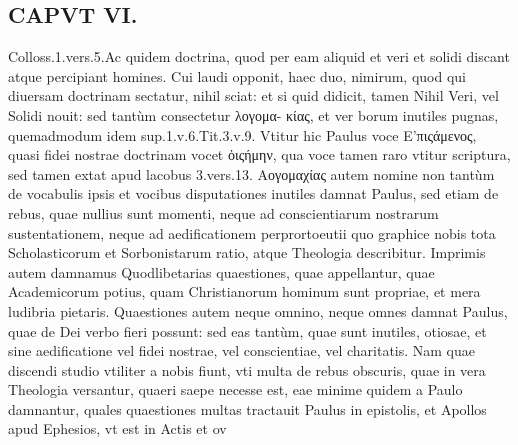 \documentclass{article}
\begin{document}
\begin{pages}
\section*{CAPVT  VI. }
\marginpar{[ p.427 ]}\pstart Colloss.1.vers.5.Ac quidem doctrina, quod per eam aliquid et veri et solidi discant atque percipiant homines. Cui laudi opponit, haec duo, nimirum, quod qui diuersam doctrinam sectatur, nihil sciat: et si quid didicit, tamen Nihil Veri, vel Solidi nouit: sed tantùm consectetur λογομα- κίας, et ver borum inutiles pugnas, quemadmodum idem sup.1.v.6.Tit.3.v.9. Vtitur hic Paulus voce Ε'πιςάμενος, quasi fidei nostrae doctrinam vocet ὀιςήμην, qua voce tamen raro vtitur scriptura, sed tamen extat apud lacobus 3.vers.13.  \pend\pstart Αογομαχίας autem nomine non tantùm de vocabulis ipsis et vocibus disputationes inutiles damnat Paulus, sed etiam de rebus, quae nullius sunt momenti, neque ad conscientiarum nostrarum sustentationem, neque ad aedificationem perprortoeutii quo graphice nobis tota Scholasticorum et Sorbonistarum ratio, atque Theologia describitur. Imprimis autem damnamus Quodlibetarias quaestiones, quae appellantur, quae Academicorum potius, quam Christianorum hominum sunt propriae, et mera ludibria pietaris.  \pend\pstart Quaestiones autem neque omnino, neque omnes damnat Paulus, quae de Dei verbo fieri possunt: sed eas tantùm, quae sunt inutiles, otiosae, et sine aedificatione vel fidei nostrae, vel conscientiae, vel charitatis. Nam quae discendi studio vtiliter a nobis fiunt, vti multa de rebus obscuris, quae in vera Theologia versantur, quaeri saepe necesse est, eae minime quidem a Paulo damnantur, quales quaestiones multas tractauit Paulus in epistolis, et Apollos apud Ephesios, vt est in Actis et ov\pend

\end{pages}
\end{document}
